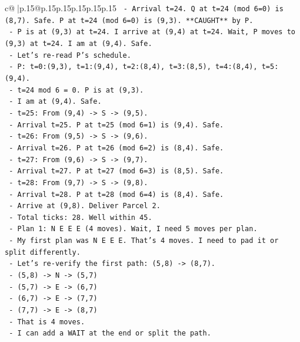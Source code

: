 \documentclass{article}
\begin{document}
{\begin{supertabular}{c@{$\;$}|p{.15\linewidth}@{}p{.15\linewidth}p{.15\linewidth}p{.15\linewidth}p{.15\linewidth}p{.15\linewidth}}
{{{\texttt{       {-} Arrival t=24. Q at t=24 (mod 6=0) is (8,7). Safe. P at t=24 (mod 6=0) is (9,3). **CAUGHT** by P.} \\
\texttt{       {-} P is at (9,3) at t=24. I arrive at (9,4) at t=24. Wait, P moves to (9,3) at t=24. I am at (9,4). Safe.} \\
\texttt{       {-} Let's re{-}read P's schedule.} \\
\texttt{       {-} P: t=0:(9,3), t=1:(9,4), t=2:(8,4), t=3:(8,5), t=4:(8,4), t=5:(9,4).} \\
\texttt{       {-} t=24 mod 6 = 0. P is at (9,3).} \\
\texttt{       {-} I am at (9,4). Safe.} \\
\texttt{     {-} t=25: From (9,4) {-}> S {-}> (9,5).} \\
\texttt{       {-} Arrival t=25. P at t=25 (mod 6=1) is (9,4). Safe.} \\
\texttt{     {-} t=26: From (9,5) {-}> S {-}> (9,6).} \\
\texttt{       {-} Arrival t=26. P at t=26 (mod 6=2) is (8,4). Safe.} \\
\texttt{     {-} t=27: From (9,6) {-}> S {-}> (9,7).} \\
\texttt{       {-} Arrival t=27. P at t=27 (mod 6=3) is (8,5). Safe.} \\
\texttt{     {-} t=28: From (9,7) {-}> S {-}> (9,8).} \\
\texttt{       {-} Arrival t=28. P at t=28 (mod 6=4) is (8,4). Safe.} \\
\texttt{       {-} Arrive at (9,8). Deliver Parcel 2.} \\
\texttt{     {-} Total ticks: 28. Well within 45.} \\
\texttt{     {-} Plan 1: N E E E (4 moves). Wait, I need 5 moves per plan.} \\
\texttt{     {-} My first plan was N E E E. That's 4 moves. I need to pad it or split differently.} \\
\texttt{     {-} Let's re{-}verify the first path: (5,8) {-}> (8,7).} \\
\texttt{       {-} (5,8) {-}> N {-}> (5,7)} \\
\texttt{       {-} (5,7) {-}> E {-}> (6,7)} \\
\texttt{       {-} (6,7) {-}> E {-}> (7,7)} \\
\texttt{       {-} (7,7) {-}> E {-}> (8,7)} \\
\texttt{       {-} That is 4 moves.} \\
\texttt{       {-} I can add a WAIT at the end or split the path.} \\
}}}
\end{supertabular}}
\end{document}
